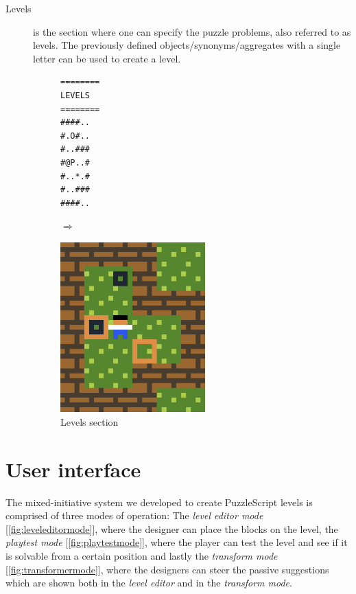 \begin{description}
    \item[Levels] is the section where one can specify the puzzle problems, also referred to as levels.
    The previously defined objects/synonyms/aggregates with a single letter can be used to create a level.
            \begin{figure}[!htbp]
    \begin{minipage}{0.4\textwidth}
        \centering
    \begin{lstlisting}
========
LEVELS
========
####..
#.O#..
#..###
#@P..#
#..*.#
#..###
####..
    \end{lstlisting}
    
    \end{minipage} \qquad $\Longrightarrow$ \hfill
    \begin{minipage}{0.4\textwidth}
        
        \includegraphics[width=0.55\textwidth]{figures/level1.png}
    \end{minipage}
    \caption{Levels section}
    \end{figure}
     
\end{description}


\section{User interface}

The mixed-initiative system we developed to create PuzzleScript levels is comprised of three modes of operation: The \textit{level editor mode} [\autoref{fig:leveleditormode}], where the designer can place the blocks on the level, the \textit{playtest mode} [\autoref{fig:playtestmode}], where the player can test the level and see if it is solvable from a certain position and lastly the \textit{transform mode} [\autoref{fig:transformermode}], where the designers can steer the passive suggestions which are shown both in the \textit{level editor} and in the \textit{transform mode}.


